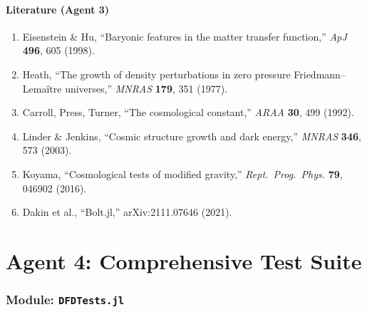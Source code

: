 \documentclass[11pt,a4paper]{article}
\begin{document}
\subsection{Literature (Agent 3)}

\begin{enumerate}
\item Eisenstein \& Hu, ``Baryonic features in the matter transfer function,'' \textit{ApJ} \textbf{496}, 605 (1998).
\item Heath, ``The growth of density perturbations in zero pressure Friedmann--Lema\^itre universes,'' \textit{MNRAS} \textbf{179}, 351 (1977).
\item Carroll, Press, Turner, ``The cosmological constant,'' \textit{ARAA} \textbf{30}, 499 (1992).
\item Linder \& Jenkins, ``Cosmic structure growth and dark energy,'' \textit{MNRAS} \textbf{346}, 573 (2003).
\item Koyama, ``Cosmological tests of modified gravity,'' \textit{Rept.\ Prog.\ Phys.} \textbf{79}, 046902 (2016).
\item Dakin et al., ``Bolt.jl,'' arXiv:2111.07646 (2021).
\end{enumerate}


\part{Agent 4: Comprehensive Test Suite}
\label{part:test-suite}

\section{Module: \texttt{DFDTests.jl}}
\end{document}
